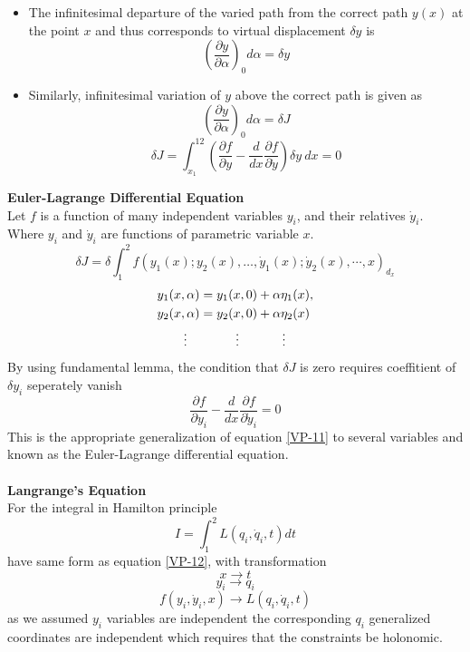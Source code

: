 	\begin{itemize}
		\item The infinitesimal departure of the varied path from the correct path $y(x)$ at the point $x$ and thus corresponds to virtual displacement $\delta y$ is
		$$\left( \frac{\partial y}{\partial\alpha}\right)_0 d\alpha=\delta y$$
\item Similarly, infinitesimal variation of $y$ above the correct path is given as		
		$$\left( \frac{\partial y}{\partial\alpha}\right)_0 d\alpha=\delta J$$
		$$\delta J=\int_{x_{1}}^{12}\left(\frac{\partial f}{\partial y}-\frac{d}{d x} \frac{\partial f}{\partial \dot{y}}\right)\delta y\ dx=0$$
	\end{itemize}
\textbf{Euler-Lagrange Differential Equation}\\
Let $f$ is a function of many independent variables $y_i$, and their relatives $\dot{y}_i$. Where $y_i$ and $\dot{y}_i$ are functions of parametric variable $x$.
\begin{equation}
\delta J=\delta \int_{1}^{2} f\left(y_{1}(x) ; y_{2}(x), \ldots, \dot{y}_{1}(x) ; \dot{y}_{2}(x), \cdots, x\right)_{d_{x}}\label{VP-12}
\end{equation}
\begin{align*}
y_{1}(x, \alpha)&=y_{1}(x, 0)+\alpha \eta_{1}(x),\\
y_{2}(x, \alpha)&=y_{2}(x, 0)+\alpha \eta_{2}(x)\\
\vdots\quad&\hspace{1cm}\vdots\hspace{1.2cm}\vdots
\end{align*}
By using fundamental lemma, the condition that $\delta J$ is zero requires coeffitient of $\delta y_i$ seperately vanish
\begin{equation}
\frac{\partial f}{\partial y_{i}}-\frac{d}{d x} \frac{\partial f}{\partial \dot{y}_{i}}=0\label{VP-13}
\end{equation}
This is the appropriate generalization of equation \ref{VP-11} to several variables and known as the Euler-Lagrange differential equation.\\\\
\textbf{Langrange's Equation}\\
For the integral in Hamilton principle
$$I=\int_{1}^{2} L\left(q_{i}, \dot{q}_{i}, t\right) d t$$
have same form as equation \ref{VP-12}, with transformation 
$$x\rightarrow t$$
$$y_i\rightarrow q_i$$
$$f(y_i,\dot{y}_i,x)\rightarrow L(q_i,\dot{q}_i,t)$$
as we assumed $y_i$ variables are independent the corresponding $q_i$ generalized coordinates are independent which requires that the constraints be holonomic.\\
